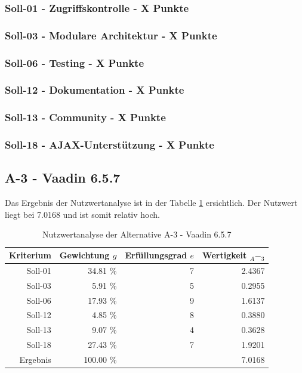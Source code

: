   \subsubsection{Soll-01 - Zugriffskontrolle - X Punkte}
  
  \subsubsection{Soll-03 - Modulare Architektur - X Punkte}
  
  \subsubsection{Soll-06 - Testing - X Punkte}
  
  \subsubsection{Soll-12 - Dokumentation - X Punkte}
  
  \subsubsection{Soll-13 - Community - X Punkte}

  \subsubsection{Soll-18 - AJAX-Unterstützung - X Punkte}
  
  \subsection{A-3 - Vaadin 6.5.7}
  
  Das Ergebnis der Nutzwertanalyse ist in der Tabelle \ref{tab:nwaA3}
  ersichtlich. Der Nutzwert liegt bei 7.0168 und ist somit relativ hoch.
    
  \begin{table}[ht]
    \sffamily 
    \begin{center}
      \begin{tabular}{r|rrr}
        \toprule
        \textbf{Kriterium} & \textbf{Gewichtung \(g\)} & \textbf{Erfüllungsgrad
        \(e\)} & \textbf{Wertigkeit \(_A-_3\)} \\
        \midrule
        Soll-01   & 34.81 \% & 7 & 2.4367 \\
        Soll-03   &  5.91 \% & 5 & 0.2955 \\
        Soll-06   & 17.93 \% & 9 & 1.6137 \\
        Soll-12   &  4.85 \% & 8 & 0.3880 \\
        Soll-13   &  9.07 \% & 4 & 0.3628 \\
        Soll-18   & 27.43 \% & 7 & 1.9201 \\
        \midrule
        \midrule
        Ergebnis  & 100.00 \% &   & 7.0168 \\
        \bottomrule
      \end{tabular}
      \caption{Nutzwertanalyse der Alternative A-3 - Vaadin 6.5.7}
      \label{tab:nwaA3}
    \end{center}
  \end{table}
  
